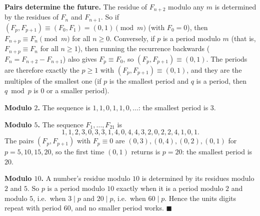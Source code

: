 \textbf{Pairs determine the future.} The residue of $F_{n+2}$ modulo any $m$ is determined by the residues of $F_n$ and $F_{n+1}$. So if $(F_{p},F_{p+1})\equiv(F_0,F_1)=(0,1)\pmod m$ (with $F_0=0$), then $F_{n+p}\equiv F_n\pmod m$ for all $n\ge0$. Conversely, if $p$ is a period modulo $m$ (that is, $F_{n+p}\equiv F_n$ for all $n\ge1$), then running the recurrence backwards ($F_n=F_{n+2}-F_{n+1}$) also gives $F_p\equiv F_0$, so $(F_p,F_{p+1})\equiv(0,1)$. The periods are therefore exactly the $p\ge1$ with $(F_p,F_{p+1})\equiv(0,1)$, and they are the multiples of the smallest one (if $p$ is the smallest period and $q$ is a period, then $q\bmod p$ is $0$ or a smaller period).

\textbf{Modulo $2$.} The sequence is $1,1,0,1,1,0,\dots$: the smallest period is $3$.

\textbf{Modulo $5$.} The sequence $F_1,\dots,F_{21}$ is
\[
1,1,2,3,0,3,3,1,4,0,4,4,3,2,0,2,2,4,1,0,1 .
\]
The pairs $(F_p,F_{p+1})$ with $F_p\equiv0$ are $(0,3),(0,4),(0,2),(0,1)$ for $p=5,10,15,20$, so the first time $(0,1)$ returns is $p=20$: the smallest period is $20$.

\textbf{Modulo $10$.} A number's residue modulo $10$ is determined by its residues modulo $2$ and $5$. So $p$ is a period modulo $10$ exactly when it is a period modulo $2$ and modulo $5$, i.e.\ when $3\mid p$ and $20\mid p$, i.e.\ when $60\mid p$. Hence the units digits repeat with period $60$, and no smaller period works. $\blacksquare$
